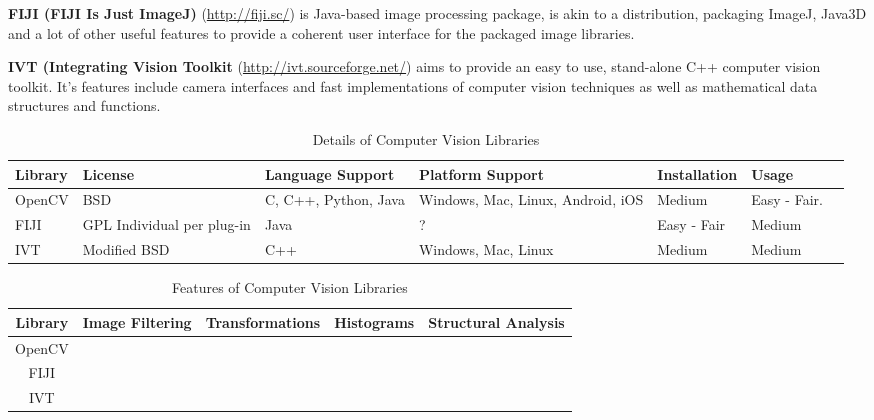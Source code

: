 \documentclass[11pt,fleqn,twoside]{article}
\begin{document}
\textbf{FIJI (FIJI Is Just ImageJ)} (\url{http://fiji.sc/}) is Java-based image processing package,
is akin to a distribution, packaging ImageJ, Java3D and a lot of other useful features to provide
a coherent user interface for the packaged image libraries.

\textbf{IVT (Integrating Vision Toolkit} (\url{http://ivt.sourceforge.net/}) aims to provide an
easy to use, stand-alone C++ computer vision toolkit. It's features include camera interfaces and
fast implementations of computer vision techniques as well as mathematical data structures and 
functions.



\begin{table}[p]
\begin{tabular}{| p{6em} | p{6em} | p{6em} | p{6em} | p{6em} | p{6em} | p{6em} |}
\hline
\textbf{Library} & \textbf{License} & \textbf{Language Support} & \textbf{Platform Support} & 
\textbf{Installation} & \textbf{Usage}\\ \hline

OpenCV & BSD & C, C++, Python, Java & Windows, Mac, Linux, Android, iOS & Medium & Easy - Fair. \\ \hline

FIJI & GPL \newline Individual per plug-in & Java & ? & Easy - Fair & Medium \\ \hline

IVT & Modified BSD & C++ & Windows, Mac, Linux & Medium & Medium \\ \hline

\hline
\end{tabular}
\caption{Details of Computer Vision Libraries}
\end{table}

\begin{table}[p]
\begin{tabular}{| c | c | c | c | c |}
\hline
\textbf{Library} & \textbf{Image Filtering} & \textbf{Transformations} & \textbf{Histograms} & \textbf{Structural Analysis} \\ \hline

OpenCV 	& \checkmark	& \checkmark	& \checkmark	& \checkmark 	\\ \hline
FIJI	& 		&		&		&		\\ \hline
IVT	&		&		&		&		\\ \hline
\end{tabular}
\caption{Features of Computer Vision Libraries}
\end{table}
\end{document}
